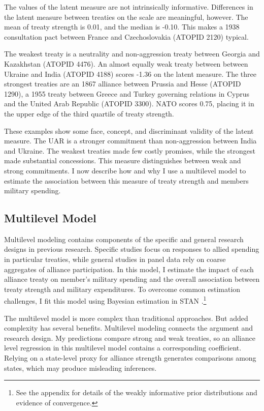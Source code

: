 \documentclass[12pt]{article}
\begin{document}
The values of the latent measure are not intrinsically informative. 
Differences in the latent measure between treaties on the scale are meaningful, however. 
The mean of treaty strength is 0.01, and the median is -0.10. 
This makes a 1938 consultation pact between France and Czechoslovakia (ATOPID 2120) typical. 


The weakest treaty is a neutrality and non-aggression treaty between Georgia and Kazakhstan (ATOPID 4476).  
An almost equally weak treaty between between Ukraine and India (ATOPID 4188) scores -1.36 on the latent measure.
The three strongest treaties are an 1867 alliance between Prussia and Hesse (ATOPID 1290), a 1955 treaty between Greece and Turkey governing relations in Cyprus and the United Arab Republic (ATOPID 3300).  
NATO scores 0.75, placing it in the upper edge of the third quartile of treaty strength.  


These examples show some face, concept, and discriminant validity of the latent measure. 
The UAR is a stronger commitment than non-aggression between India and Ukraine. 
The weakest treaties made few costly promises, while the strongest made substantial concessions. 
This measure distinguishes between weak and strong commitments. 
I now describe how and why I use a multilevel model to estimate the association between this measure of treaty strength and members military spending.  


\subsection{Multilevel Model} 


Multilevel modeling contains components of the specific and general research designs in previous research. 
Specific studies focus on responses to allied spending in particular treaties, while general studies in panel data rely on coarse aggregates of alliance participation.
In this model, I estimate the impact of each alliance treaty on member's military spending and the overall association between treaty strength and military expenditures. 
To overcome common estimation challenges, I fit this model using Bayesian estimation in STAN \citep{Carpenteretal2016}.\footnote{See the appendix for details of the weakly informative prior distributions and evidence of convergence.}


The multilevel model is more complex than traditional approaches. 
But added complexity has several benefits. 
Multilevel modeling connects the argument and research design. 
My predictions compare strong and weak treaties, so an alliance level regression in this multilevel model contains a corresponding coefficient.
Relying on a state-level proxy for alliance strength generates comparisons among states, which may produce misleading inferences. 
\end{document}
